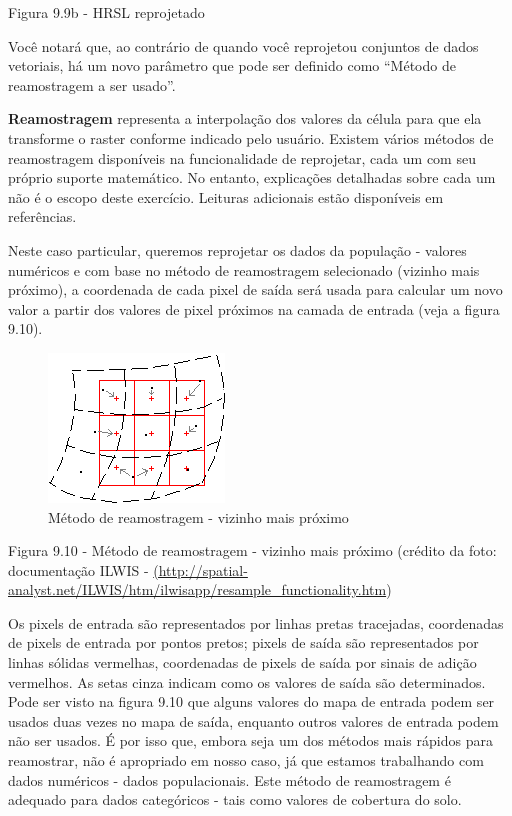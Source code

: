 \documentclass[
]{book}
\begin{document}
Figura 9.9b - HRSL reprojetado

Você notará que, ao contrário de quando você reprojetou conjuntos de dados vetoriais, há um novo parâmetro que pode ser definido como ``Método de reamostragem a ser usado''.

\textbf{Reamostragem} representa a interpolação dos valores da célula para que ela transforme o raster conforme indicado pelo usuário. Existem vários métodos de reamostragem disponíveis na funcionalidade de reprojetar, cada um com seu próprio suporte matemático. No entanto, explicações detalhadas sobre cada um não é o escopo deste exercício. Leituras adicionais estão disponíveis em referências.

Neste caso particular, queremos reprojetar os dados da população - valores numéricos e com base no método de reamostragem selecionado (vizinho mais próximo), a coordenada de cada pixel de saída será usada para calcular um novo valor a partir dos valores de pixel próximos na camada de entrada (veja a figura 9.10).

\begin{figure}
\centering
\includegraphics{media/modulo9/fig910.png}
\caption{Método de reamostragem - vizinho mais próximo}
\end{figure}

Figura 9.10 - Método de reamostragem - vizinho mais próximo (crédito da foto: documentação ILWIS - \href{http://spatial-analyst.net/ILWIS/htm/ilwisapp/resample_functionality.htm}{(http://spatial-analyst.net/ILWIS/htm/ilwisapp/resample\_functionality.htm})

Os pixels de entrada são representados por linhas pretas tracejadas, coordenadas de pixels de entrada por pontos pretos; pixels de saída são representados por linhas sólidas vermelhas, coordenadas de pixels de saída por sinais de adição vermelhos. As setas cinza indicam como os valores de saída são determinados. Pode ser visto na figura 9.10 que alguns valores do mapa de entrada podem ser usados \hspace{0pt}\hspace{0pt}duas vezes no mapa de saída, enquanto outros valores de entrada podem não ser usados. É por isso que, embora seja um dos métodos mais rápidos para reamostrar, não é apropriado em nosso caso, já que estamos trabalhando com dados numéricos - dados populacionais. Este método de reamostragem é adequado para dados categóricos - tais como valores de cobertura do solo.
\end{document}
